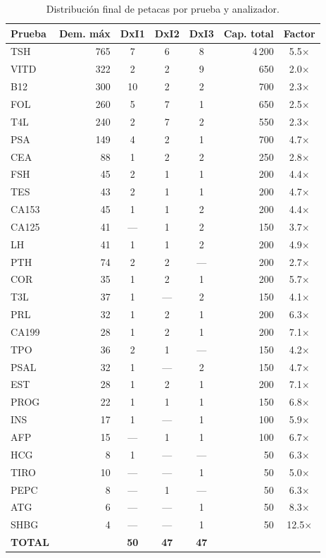 \documentclass[12pt, a4paper]{article}
\begin{document}
\begin{table}[H]
\centering
\caption{Distribución final de petacas por prueba y analizador.}
\small
\begin{tabular}{lrcccrc}
\toprule
\textbf{Prueba} & \textbf{Dem. máx} & \textbf{DxI1} & \textbf{DxI2} & \textbf{DxI3} & \textbf{Cap. total} & \textbf{Factor} \\
\midrule
TSH   & 765 &  7 &  6 &  8 & 4\,200 & 5.5$\times$ \\
VITD  & 322 &  2 &  2 &  9 &   650 & 2.0$\times$ \\
B12   & 300 & 10 &  2 &  2 &   700 & 2.3$\times$ \\
FOL   & 260 &  5 &  7 &  1 &   650 & 2.5$\times$ \\
T4L   & 240 &  2 &  7 &  2 &   550 & 2.3$\times$ \\
PSA   & 149 &  4 &  2 &  1 &   700 & 4.7$\times$ \\
CEA   &  88 &  1 &  2 &  2 &   250 & 2.8$\times$ \\
FSH   &  45 &  2 &  1 &  1 &   200 & 4.4$\times$ \\
TES   &  43 &  2 &  1 &  1 &   200 & 4.7$\times$ \\
CA153 &  45 &  1 &  1 &  2 &   200 & 4.4$\times$ \\
CA125 &  41 & --- &  1 &  2 &   150 & 3.7$\times$ \\
LH    &  41 &  1 &  1 &  2 &   200 & 4.9$\times$ \\
PTH   &  74 &  2 &  2 & --- &  200 & 2.7$\times$ \\
COR   &  35 &  1 &  2 &  1 &   200 & 5.7$\times$ \\
T3L   &  37 &  1 & --- &  2 &  150 & 4.1$\times$ \\
PRL   &  32 &  1 &  2 &  1 &   200 & 6.3$\times$ \\
CA199 &  28 &  1 &  2 &  1 &   200 & 7.1$\times$ \\
TPO   &  36 &  2 &  1 & --- &  150 & 4.2$\times$ \\
PSAL  &  32 &  1 & --- &  2 &  150 & 4.7$\times$ \\
EST   &  28 &  1 &  2 &  1 &   200 & 7.1$\times$ \\
PROG  &  22 &  1 &  1 &  1 &   150 & 6.8$\times$ \\
INS   &  17 &  1 & --- &  1 &  100 & 5.9$\times$ \\
AFP   &  15 & --- &  1 &  1 &   100 & 6.7$\times$ \\
HCG   &   8 &  1 & --- & --- &  50 & 6.3$\times$ \\
TIRO  &  10 & --- & --- &  1 &   50 & 5.0$\times$ \\
PEPC  &   8 & --- &  1 & --- &   50 & 6.3$\times$ \\
ATG   &   6 & --- & --- &  1 &   50 & 8.3$\times$ \\
SHBG  &   4 & --- & --- &  1 &   50 & 12.5$\times$ \\
\midrule
\textbf{TOTAL} & & \textbf{50} & \textbf{47} & \textbf{47} & & \\
\bottomrule
\end{tabular}
\end{table}
\end{document}
